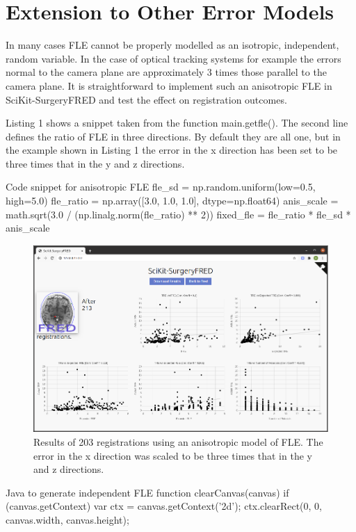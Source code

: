 \section{Extension to Other Error Models}
In many cases {FLE} cannot be properly modelled as an isotropic, independent, random variable. In the case of optical tracking systems for example \cite{736031} the errors normal to the camera plane are approximately 3 times those parallel to the camera plane. It is straightforward to implement such an anisotropic \gls{FLE} in SciKit-SurgeryFRED and test the effect on registration outcomes.

Listing 1 shows a snippet taken from the function main.getfle(). The second line defines the ratio of \gls{FLE} in three directions. By default they are all one, but in the example shown in Listing 1 the error in the x direction has been set to be three times that in the y and z directions. 

\begin{pythonlisting}{\label{lis:anis} Code snippet for anisotropic {FLE}}
    fle_sd = np.random.uniform(low=0.5, high=5.0)
    fle_ratio = np.array([3.0, 1.0, 1.0], dtype=np.float64)
    anis_scale = math.sqrt(3.0 / (np.linalg.norm(fle_ratio) ** 2))
    fixed_fle = fle_ratio * fle_sd * anis_scale
\end{pythonlisting}
\begin{figure}
	\begin{center}
	\includegraphics[width=0.7\linewidth]{images/anisitropic_error.eps}
		\caption{\label{fig:anis_errors}Results of 203 registrations using an anisotropic model of {FLE}. The error in the x direction was scaled to be three times that in the y and z directions.}
	\end{center}
\end{figure}

\begin{javalisting}{Java to generate independent FLE}
function clearCanvas(canvas) {
  if (canvas.getContext) {
    var ctx = canvas.getContext('2d');
    ctx.clearRect(0, 0, canvas.width, canvas.height);
  }
}
\end{javalisting}

